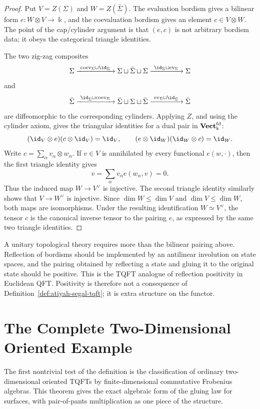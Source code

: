 \begin{proof}
Put \(V=Z(\Sigma)\) and \(W=Z(\bar\Sigma)\).  The evaluation bordism gives a
bilinear form \(e:W\otimes V\to\Bbbk\), and the coevaluation bordism gives an
element \(c\in V\otimes W\).  The point of the cap/cylinder argument is that
\((e,c)\) is not arbitrary bordism data; it obeys the categorical triangle
identities.

The two zig-zag composites
\[
  \Sigma
  \xrightarrow{\ {\rm coev}_\Sigma\sqcup\id_\Sigma\ }
  \Sigma\sqcup\bar\Sigma\sqcup\Sigma
  \xrightarrow{\ \id_\Sigma\sqcup{\rm ev}_\Sigma\ }
  \Sigma
\]
and
\[
  \bar\Sigma
  \xrightarrow{\ \id_{\bar\Sigma}\sqcup{\rm coev}_\Sigma\ }
  \bar\Sigma\sqcup\Sigma\sqcup\bar\Sigma
  \xrightarrow{\ {\rm ev}_\Sigma\sqcup\id_{\bar\Sigma}\ }
  \bar\Sigma
\]
are diffeomorphic to the corresponding cylinders.  Applying \(Z\), and using
the cylinder axiom, gives the triangular identities for a dual pair in
\({\bf Vect}^{\rm fd}_{\Bbbk}\):
\[
  (\id_V\otimes e)(c\otimes\id_V)=\id_V,
  \qquad
  (e\otimes\id_W)(\id_W\otimes c)=\id_W .
\]
Write \(c=\sum_\alpha v_\alpha\otimes w_\alpha\).  If
\(v\in V\) is annihilated by every functional \(e(w,\cdot)\), then the first
triangle identity gives
\[
  v
  =
  \sum_\alpha v_\alpha e(w_\alpha,v)
  =
  0 .
\]
Thus the induced map \(W\to V^\vee\) is injective.  The second triangle
identity similarly shows that \(V\to W^\vee\) is injective.  Since
\(\dim W\leq\dim V\) and \(\dim V\leq\dim W\), both maps are isomorphisms.
Under the resulting identification \(W\simeq V^\vee\), the tensor \(c\) is
the canonical inverse tensor to the pairing \(e\), as expressed by the same
two triangle identities.
\end{proof}

A unitary topological theory requires more than the bilinear pairing above.
Reflection of bordisms should be implemented by an antilinear involution on
state spaces, and the pairing obtained by reflecting a state and gluing it to
the original state should be positive.  This is the TQFT analogue of
reflection positivity in Euclidean QFT.  Positivity is therefore not a
consequence of Definition~\ref{def:atiyah-segal-tqft}; it is extra structure
on the functor.

\section{The Complete Two-Dimensional Oriented Example}

The first nontrivial test of the definition is the classification of ordinary
two-dimensional oriented TQFTs by finite-dimensional commutative Frobenius
algebras.  This theorem gives the exact algebraic form of the gluing law for
surfaces, with pair-of-pants multiplication as one piece of the structure.

